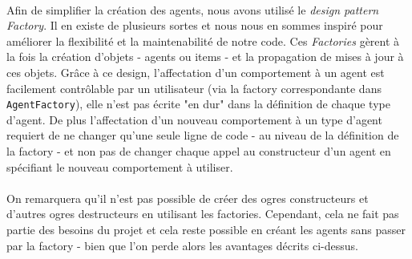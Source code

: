 \paragraph{}
Afin de simplifier la création des agents, nous avons utilisé le \emph{design
pattern Factory}. Il en existe de plusieurs sortes et nous nous en sommes
inspiré pour améliorer la flexibilité et la maintenabilité de notre
code. Ces \emph{Factories} gèrent à la fois la création d'objets - agents ou
items - et la propagation de mises à jour à ces objets. Grâce à ce design,
l'affectation d'un comportement à un agent est facilement contrôlable par un
utilisateur (via la factory correspondante dans \verb!AgentFactory!), elle
n'est pas écrite "en dur" dans la définition de chaque type d'agent. De plus
l'affectation d'un nouveau comportement à un type d'agent requiert de ne
changer qu'une seule ligne de code - au niveau de la définition de la factory
- et non pas de changer chaque appel au constructeur d'un agent en spécifiant
le nouveau comportement à utiliser.

\paragraph{}
On remarquera qu'il n'est pas possible de créer des ogres constructeurs et
d'autres ogres destructeurs en utilisant les factories. Cependant, cela ne
fait pas partie des besoins du projet et cela reste possible en créant les
agents sans passer par la factory - bien que l'on perde alors les avantages
décrits ci-dessus.
